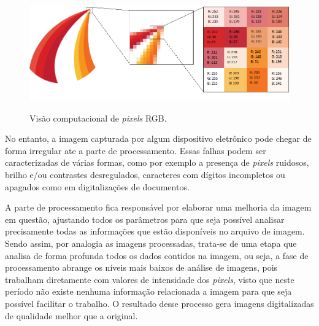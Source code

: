 \begin{figure}[!htb]
\caption{{\footnotesize Visão computacional de \textit{pixels} RGB.}}
 
\centering %
\includegraphics[width=12cm]{revisao-bibliografica/Figuras/Computer-Vision-Pixel-RGB.png}%
\label{figura:figura5}

\centering {}
{
\label{figura:figura5}
}
\end{figure}

No entanto, a imagem capturada por algum dispositivo eletrônico pode chegar de forma irregular ate a parte de processamento. Essas falhas podem ser caracterizadas de várias formas, como por exemplo a presença de \textit{pixels} ruidosos, brilho e/ou contrastes desregulados, caracteres com dígitos incompletos ou apagados como em digitalizações de documentos.

A parte de processamento fica responsável por elaborar uma melhoria da imagem em questão, ajustando todos os parâmetros para que seja possível analisar precisamente todas as informações que estão disponíveis no arquivo de imagem. Sendo assim, por analogia as imagens processadas, trata-se de uma etapa que analisa de forma profunda todos os dados contidos na imagem, ou seja, a fase de processamento abrange os níveis mais baixos de análise de imagens, pois trabalham diretamente com valores de intensidade dos \textit{pixels}, visto que neste período não existe nenhuma informação relacionada a imagem para que seja possível facilitar o trabalho. O resultado desse processo gera imagens digitalizadas de qualidade melhor que a original.